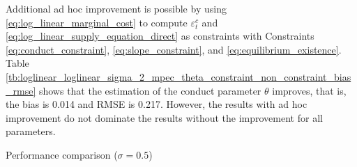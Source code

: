 \documentclass[11pt, a4paper]{article}
\theoremstyle{remark}
\begin{document}
Additional ad hoc improvement is possible by using \eqref{eq:log_linear_marginal_cost} to compute $\varepsilon_t^c$ and \eqref{eq:log_linear_supply_equation_direct} as constraints with Constraints \eqref{eq:conduct_constraint}, \eqref{eq:slope_constraint}, and \eqref{eq:equilibrium_existence}. 
Table \ref{tb:loglinear_loglinear_sigma_2_mpec_theta_constraint_non_constraint_bias_rmse} shows that the estimation of the conduct parameter $\theta$ improves, that is, the bias is 0.014 and RMSE is 0.217. 
However, the results with ad hoc improvement do not dominate the results without the improvement for all parameters.



\begin{table}[!htbp]
  \centering
  \caption{Performance comparison ($\sigma=0.5$)}
  \label{tb:loglinear_loglinear_sigma_0.5_simultaneous_theta_constraint_slope_constraint_bias_rmse}
  \\[0.5em]
  \begin{adjustbox}{width=0.95\textwidth}
    
  \end{adjustbox}
  \vspace{1.5em}  %
  \\[0.5em]
  \begin{adjustbox}{width=0.95\textwidth}
   
  \end{adjustbox}
  \footnotesize
\end{table}
\end{document}
